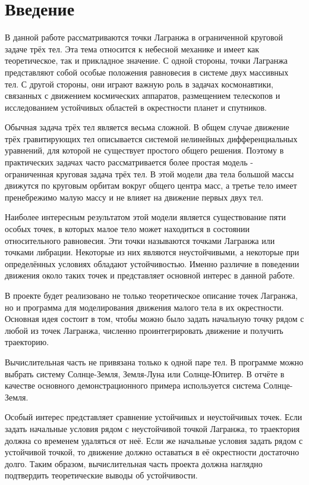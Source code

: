 \newpage
\section*{Введение}

В данной работе рассматриваются точки Лагранжа в ограниченной круговой задаче
трёх тел. Эта тема относится к небесной механике и имеет как теоретическое,
так и прикладное значение. С одной стороны, точки Лагранжа представляют собой
особые положения равновесия в системе двух массивных тел. С другой стороны,
они играют важную роль в задачах космонавтики, связанных с движением
космических аппаратов, размещением телескопов и исследованием устойчивых
областей в окрестности планет и спутников.

Обычная задача трёх тел является весьма сложной. В общем случае движение трёх
гравитирующих тел описывается системой нелинейных дифференциальных уравнений,
для которой не существует простого общего решения. Поэтому в практических
задачах часто рассматривается более простая модель - ограниченная круговая
задача трёх тел. В этой модели два тела большой массы движутся по круговым
орбитам вокруг общего центра масс, а третье тело имеет пренебрежимо малую
массу и не влияет на движение первых двух тел.

Наиболее интересным результатом этой модели является существование пяти
особых точек, в которых малое тело может находиться в состоянии относительного
равновесия. Эти точки называются точками Лагранжа или точками либрации.
Некоторые из них являются неустойчивыми, а некоторые при определённых условиях
обладают устойчивостью. Именно различие в поведении движения около таких точек
и представляет основной интерес в данной работе.

В проекте будет реализовано не только теоретическое описание точек Лагранжа,
но и программа для моделирования движения малого тела в их окрестности.
Основная идея состоит в том, чтобы можно было задать начальную точку рядом с
любой из точек Лагранжа, численно проинтегрировать движение и получить
траекторию.

Вычислительная часть не привязана только к одной паре тел. В программе можно
выбрать систему Солнце-Земля, Земля-Луна или Солнце-Юпитер. В отчёте в
качестве основного демонстрационного примера используется система
Солнце-Земля.

Особый интерес представляет сравнение устойчивых и неустойчивых точек. Если
задать начальные условия рядом с неустойчивой точкой Лагранжа, то траектория
должна со временем удаляться от неё. Если же начальные условия задать рядом с
устойчивой точкой, то движение должно оставаться в её окрестности достаточно
долго. Таким образом, вычислительная часть проекта должна наглядно подтвердить
теоретические выводы об устойчивости.

